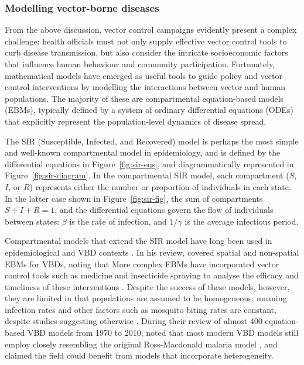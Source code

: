 \subsubsection{Modelling vector-borne diseases}\label{sec:model-vbds}

From the above discussion, vector control campaigns evidently present a complex challenge: health officials must not only supply effective vector control tools to curb disease transmission, but also consider the intricate socioeconomic factors that influence human behaviour and community participation. Fortunately, mathematical models have emerged as useful tools to guide policy and vector control interventions by modelling the interactions between vector and human populations. The majority of these are compartmental equation-based models (EBMs), typically defined by a system of ordinary differential equations (ODEs) that explicitly represent the population-level dynamics of disease spread.

The SIR (Susceptible, Infected, and Recovered) model is perhaps the most simple and well-known compartmental model in epidemiology, and is defined by the differential equations in Figure~\ref{fig:sir-eqs}, and diagrammatically represented in Figure~\ref{fig:sir-diagram}. In the compartmental SIR model, each compartment ($S$, $I$, or $R$) represents either the number or proportion of individuals in each state. In the latter case shown in Figure~\ref{fig:sir-fig}, the sum of compartments $S+I+R=1$, and the differential equations govern the flow of individuals between states: $\beta$ is the rate of infection, and $1/\gamma$ is the average infectious period.



Compartmental models that extend the SIR model have long been used in epidemiological and VBD contexts \cite{tang_review_2020}. In his review, \citet{cosner_models_2015} covered spatial and non-spatial EBMs for VBDs, noting that  More complex EBMs have incorporated vector control tools such as medicine and insecticide spraying to analyse the efficacy and timeliness of these interventions \cite{reiner_systematic_2013}. Despite the success of these models, however, they are limited in that populations are assumed to be homogeneous, meaning infection rates and other factors such as mosquito biting rates are constant, despite studies suggesting otherwise \cite{perkins_heterogeneity_2013}. During their review of almost 400 equation-based VBD models from 1970 to 2010, \citet{reiner_systematic_2013} noted that most modern VBD models still employ  closely resembling the original Ross-Macdonald malaria model \cite{ross_report_1908,macdonald_epidemiology_1957}, and claimed the field could benefit from models that incorporate heterogeneity.

